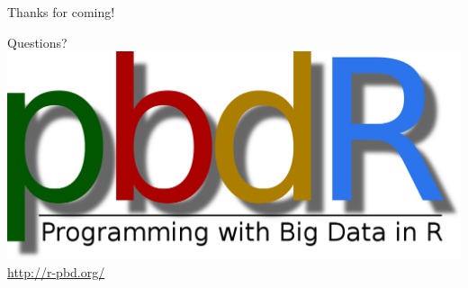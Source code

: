 \begin{frame}[noframenumbering]
  \begin{block}{Thanks for coming!}
    \begin{center}
      \vspace{.4cm}
      {\Huge Questions?}\\[.8cm]
      \includegraphics[scale=.1]{../common/pics/logos/newpbdr}
      \\[.1cm]
      \url{http://r-pbd.org/}
    \end{center}
  \end{block}
\end{frame}
